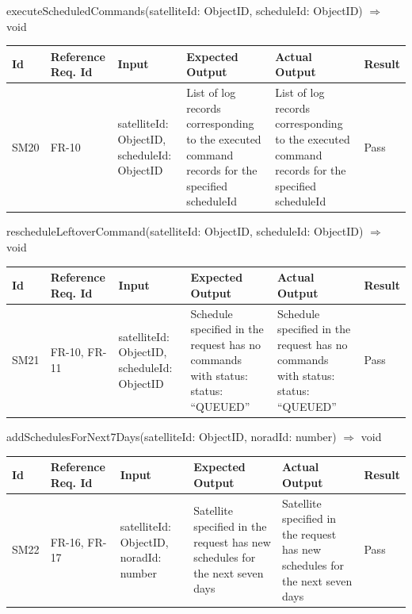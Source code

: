 \documentclass[12pt, titlepage]{article}
\begin{document}
executeScheduledCommands(satelliteId: ObjectID, scheduleId: ObjectID) $\Rightarrow$ void

\begin{center}
\begin{tabular}{|p{1cm} | p{2cm} |p{2cm}| p{2cm} |p{2cm}| p{2cm}|}
\hline
\textbf{Id} & \textbf{Reference Req. Id} & \textbf{Input} & \textbf{Expected Output} & \textbf{Actual Output} & \textbf{Result} \\
\hline
SM20 & FR-10 & { satelliteId: ObjectID,
scheduleId: ObjectID } & List of log records corresponding to the executed command records for the specified scheduleId & List of log records corresponding to the executed command records for the specified scheduleId & Pass
\\
\hline

\end{tabular}

\end{center}

rescheduleLeftoverCommand(satelliteId: ObjectID, scheduleId: ObjectID) $\Rightarrow$ void

\begin{center}
\begin{tabular}{|p{1cm} | p{2cm} |p{2cm}| p{2cm} |p{2cm}| p{2cm}|}
\hline
\textbf{Id} & \textbf{Reference Req. Id} & \textbf{Input} & \textbf{Expected Output} & \textbf{Actual Output} & \textbf{Result} \\
\hline
SM21 & FR-10, FR-11 & { satelliteId: ObjectID,
scheduleId: ObjectID } & Schedule specified in the request has no commands with status:
 {status: “QUEUED”}
 & Schedule specified in the request has no commands with status:
 {status: “QUEUED”} & Pass
\\
\hline

\end{tabular}

\end{center}

addSchedulesForNext7Days(satelliteId: ObjectID, noradId: number) $\Rightarrow$ void

\begin{center}
\begin{tabular}{|p{1cm} | p{2cm} |p{2cm}| p{2cm} |p{2cm}| p{2cm}|}
\hline
\textbf{Id} & \textbf{Reference Req. Id} & \textbf{Input} & \textbf{Expected Output} & \textbf{Actual Output} & \textbf{Result} \\
\hline
SM22 & FR-16, FR-17 & { satelliteId: ObjectID,
noradId: number } & Satellite specified in the request has new schedules for the next seven days
 & Satellite specified in the request has new schedules for the next seven days & Pass
\\
\hline

\end{tabular}

\end{center}
\end{document}
